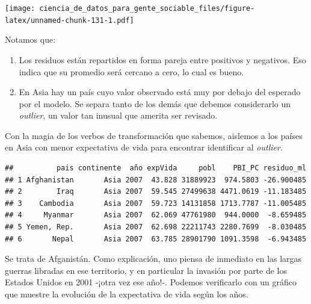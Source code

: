\documentclass[]{book}
\newenvironment{Shaded}{\begin{snugshade}}{\end{snugshade}}
\newcommand{\KeywordTok}[1]{\textcolor[rgb]{0.13,0.29,0.53}{\textbf{#1}}}
\newcommand{\DecValTok}[1]{\textcolor[rgb]{0.00,0.00,0.81}{#1}}
\newcommand{\StringTok}[1]{\textcolor[rgb]{0.31,0.60,0.02}{#1}}
\newcommand{\OperatorTok}[1]{\textcolor[rgb]{0.81,0.36,0.00}{\textbf{#1}}}
\newcommand{\NormalTok}[1]{#1}
\providecommand{\tightlist}{%
  \setlength{\itemsep}{0pt}\setlength{\parskip}{0pt}}
\begin{document}
\texttt{[image: ciencia\_de\_datos\_para\_gente\_sociable\_files/figure-latex/unnamed-chunk-131-1.pdf]}

Notamos que:

\begin{enumerate}
\def\labelenumi{\arabic{enumi}.}
\tightlist
\item
  Los residuos están repartidos en forma pareja entre positivos y
  negativos. Eso indica que su promedio será cercano a cero, lo cual es
  bueno.
\item
  En Asia hay un país cuyo valor observado está muy por debajo del
  esperado por el modelo. Se separa tanto de los demás que debemos
  considerarlo un \emph{outlier}, un valor tan inusual que amerita ser
  revisado.
\end{enumerate}

Con la magia de los verbos de transformación que sabemos, aislemos a los
países en Asia con menor expectativa de vida para encontrar identificar
al \emph{outlier}.

\begin{Shaded}
\end{Shaded}

\begin{verbatim}
##          pais continente  año expVida     pobl    PBI_PC residuo_ml
## 1 Afghanistan       Asia 2007  43.828 31889923  974.5803 -26.900485
## 2        Iraq       Asia 2007  59.545 27499638 4471.0619 -11.183485
## 3    Cambodia       Asia 2007  59.723 14131858 1713.7787 -11.005485
## 4     Myanmar       Asia 2007  62.069 47761980  944.0000  -8.659485
## 5 Yemen, Rep.       Asia 2007  62.698 22211743 2280.7699  -8.030485
## 6       Nepal       Asia 2007  63.785 28901790 1091.3598  -6.943485
\end{verbatim}

Se trata de Afganistán. Como explicación, uno piensa de inmediato en las
largas guerras libradas en ese territorio, y en particular la invasión
por parte de los Estados Unidos en 2001 -¡otra vez ese año!-. Podemos
verificarlo con un gráfico que muestre la evolución de la expectativa de
vida según los años.
\end{document}
